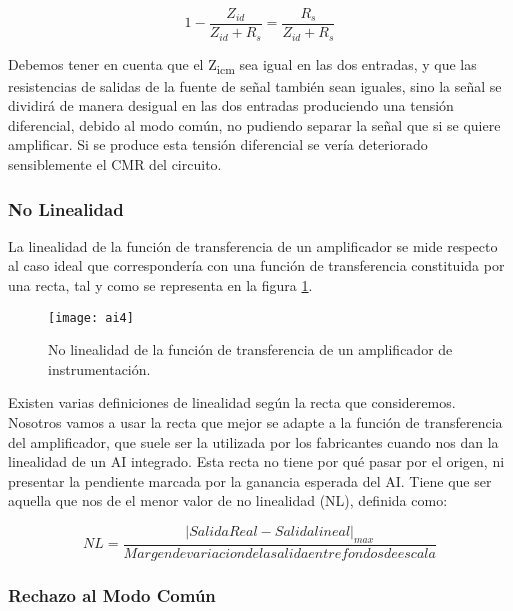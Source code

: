 \begin{equation}\label{eq4}
1 - \frac{Z_{id}}{Z_{id}+R_{s}}= \frac{R_{s}}{Z_{id}+R_{s}}
\end{equation}

Debemos tener en cuenta que el Z\textsubscript{icm} sea igual en las dos entradas, y que las resistencias de salidas de la fuente de señal también sean iguales, sino la señal se dividirá de manera desigual en las dos entradas produciendo una tensión diferencial, debido al modo común, no pudiendo separar la señal que si se quiere amplificar. Si se produce esta tensión diferencial se vería deteriorado sensiblemente el CMR del circuito.


\subsubsection{No Linealidad} %
\label{no_linealidad}

La linealidad de la función de transferencia de un amplificador se mide
respecto al caso ideal que correspondería con una función de transferencia constituida
por una recta, tal y como se representa en la figura \ref{fig:linealidad}.

\begin{figure}[h]
  \centering
  \texttt{[image: ai4]}
  \caption{No linealidad de la función de transferencia de un amplificador de instrumentación.}\label{fig:linealidad}
\end{figure}

Existen varias definiciones de linealidad según la recta que consideremos. Nosotros vamos a usar la recta que mejor se adapte a la función de transferencia del amplificador, que suele ser la utilizada por los fabricantes cuando nos dan la linealidad de un AI integrado. Esta recta no tiene por qué pasar por el origen, ni presentar la pendiente marcada por la ganancia esperada del AI. Tiene que ser aquella que nos de el menor valor de no linealidad (NL), definida como:

\begin{equation}\label{eq5}
NL = \frac{|Salida Real - Salida lineal|_{max}}{Margen de variacion de la salida entre fondos de escala}
\end{equation}


\subsubsection{Rechazo al Modo Común} %
\label{rechazo_CMR}

